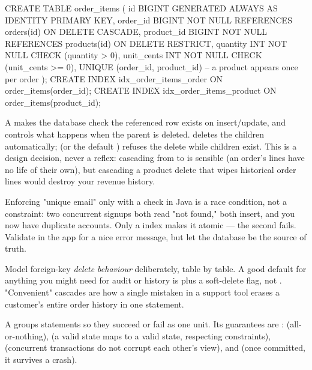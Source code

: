 \begin{sqlbox}
CREATE TABLE order_items (
  id          BIGINT GENERATED ALWAYS AS IDENTITY PRIMARY KEY,
  order_id    BIGINT NOT NULL REFERENCES orders(id)
                ON DELETE CASCADE,
  product_id  BIGINT NOT NULL REFERENCES products(id)
                ON DELETE RESTRICT,
  quantity    INT    NOT NULL CHECK (quantity > 0),
  unit_cents  INT    NOT NULL CHECK (unit_cents >= 0),
  UNIQUE (order_id, product_id)   -- a product appears once per order
);
CREATE INDEX idx_order_items_order   ON order_items(order_id);
CREATE INDEX idx_order_items_product ON order_items(product_id);
\end{sqlbox}

 A  makes the database check the referenced row exists on insert/update, and controls what happens when the parent is deleted.  deletes the children automatically;  (or the default ) refuses the delete while children exist. This is a design decision, never a reflex: cascading from  to  is sensible (an order's lines have no life of their own), but cascading a product delete that wipes historical order lines would destroy your revenue history.

\begin{secwarn}
Enforcing "unique email" only with a  check in Java is a race condition, not a constraint: two concurrent signups both read "not found," both insert, and you now have duplicate accounts. Only a  index makes it atomic --- the second  fails. Validate in the app for a nice error message, but let the database be the source of truth.
\end{secwarn}

\begin{seniornote}
Model foreign-key \emph{delete behaviour} deliberately, table by table. A good default for anything you might need for audit or history is  plus a soft-delete flag, not . "Convenient" cascades are how a single mistaken  in a support tool erases a customer's entire order history in one statement.
\end{seniornote}


 A  groups statements so they succeed or fail as one unit. Its guarantees are :  (all-or-nothing),  (a valid state maps to a valid state, respecting constraints),  (concurrent transactions do not corrupt each other's view), and  (once committed, it survives a crash).

